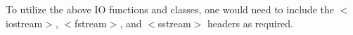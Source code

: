 To utilize the above IO functions and classes, one would need to include the {\ttfamily \texorpdfstring{$<$}{<}iostream\texorpdfstring{$>$}{>}}, {\ttfamily \texorpdfstring{$<$}{<}fstream\texorpdfstring{$>$}{>}}, and {\ttfamily \texorpdfstring{$<$}{<}sstream\texorpdfstring{$>$}{>}} headers as required. 
